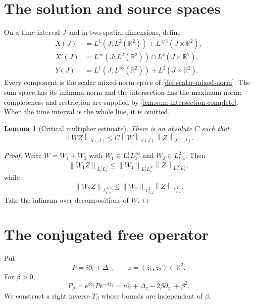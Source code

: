 \documentclass[11pt,oneside]{book}
\newtheorem{lemma}[theorem]{Lemma}
\theoremstyle{definition}
\theoremstyle{remark}
\newcommand{\R}{\mathbb R}
\newcommand{\1}{\mathbf 1}
\newcommand{\norm}[1]{\left\lVert #1\right\rVert}
\newcommand{\e}{\mathrm e}
\begin{document}
\section{The solution and source spaces}
On a time interval $J$ and in two spatial dimensions, define
\begin{align}
 X(J)&=L^1(J;L^2(\R^2))+L^{4/3}(J\times\R^2),       \label{eq:X-space}\\
 X'(J)&=L^\infty(J;L^2(\R^2))\cap L^4(J\times\R^2),\label{eq:Xprime-space}\\
 Y(J)&=L^1(J;L^\infty(\R^2))+L^2(J\times\R^2).     \label{eq:Y-space}
\end{align}
Every component is the scalar mixed-norm space of
\cref{def:scalar-mixed-norm}.  The sum space has its infimum norm and the
intersection has the maximum norm; completeness and restriction are supplied
by \cref{lem:sum-intersection-complete}.  When the time interval is the whole
line, it is omitted.

\begin{lemma}[Critical multiplier estimate]\label{lem:XY-multiplier}
There is an absolute $C$ such that
\begin{equation}
  \norm{WZ}_{X(J)}\le C\norm W_{Y(J)}\norm Z_{X'(J)}. \label{eq:XY-multiplier}
\end{equation}
\end{lemma}

\begin{proof}
Write $W=W_1+W_2$ with
$W_1\in L^1_tL^\infty_z$ and $W_2\in L^2_{t,z}$.  Then
\[
 \norm{W_1Z}_{L^1_tL^2_z}
 \le\norm{W_1}_{L^1_tL^\infty_z}\norm Z_{L^\infty_tL^2_z},
\]
while
\[
 \norm{W_2Z}_{L^{4/3}_{t,z}}
 \le\norm{W_2}_{L^2_{t,z}}\norm Z_{L^4_{t,z}}.
\]
Take the infimum over decompositions of $W$.
\end{proof}

\section{The conjugated free operator}
Put
\[
  P=i\partial_t+\Delta_z,
  \qquad z=(z_1,z_2)\in\R^2.
\]
For $\beta>0$,
\begin{equation}
 P_\beta=\e^{\beta z_1}P\e^{-\beta z_1}
 =i\partial_t+\Delta_z-2\beta\partial_{z_1}+\beta^2. \label{eq:Pbeta}
\end{equation}
We construct a right inverse $T_\beta$ whose bounds are independent of
$\beta$.
\end{document}
